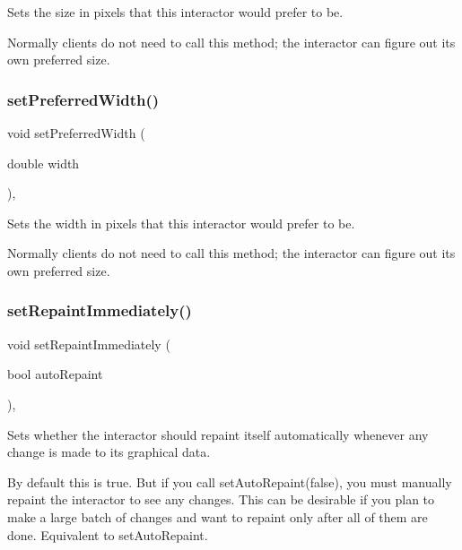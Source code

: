 Sets the size in pixels that this interactor would prefer to be. 

Normally clients do not need to call this method; the interactor can figure out its own preferred size. \mbox{\label{classGInteractor_a3db429ab2fa52efd187eec0ed8cdd9f2}} 
\subsubsection{\texorpdfstring{set\+Preferred\+Width()}{setPreferredWidth()}}
{\footnotesize\ttfamily void set\+Preferred\+Width (\begin{DoxyParamCaption}\item[{double}]{width }\end{DoxyParamCaption})\hspace{0.3cm}{\ttfamily [virtual]}, {\ttfamily [inherited]}}



Sets the width in pixels that this interactor would prefer to be. 

Normally clients do not need to call this method; the interactor can figure out its own preferred size. \mbox{\label{classGDrawingSurface_abf5590a3992dcb7896ed449e65961da3}} 
\subsubsection{\texorpdfstring{set\+Repaint\+Immediately()}{setRepaintImmediately()}}
{\footnotesize\ttfamily void set\+Repaint\+Immediately (\begin{DoxyParamCaption}\item[{bool}]{auto\+Repaint }\end{DoxyParamCaption})\hspace{0.3cm}{\ttfamily [virtual]}, {\ttfamily [inherited]}}



Sets whether the interactor should repaint itself automatically whenever any change is made to its graphical data. 

By default this is true. But if you call set\+Auto\+Repaint(false), you must manually repaint the interactor to see any changes. This can be desirable if you plan to make a large batch of changes and want to repaint only after all of them are done. Equivalent to set\+Auto\+Repaint. \mbox{\label{classGDrawingSurface_a8bcbd65fa784bdab1e66a9efd381162d}} 
